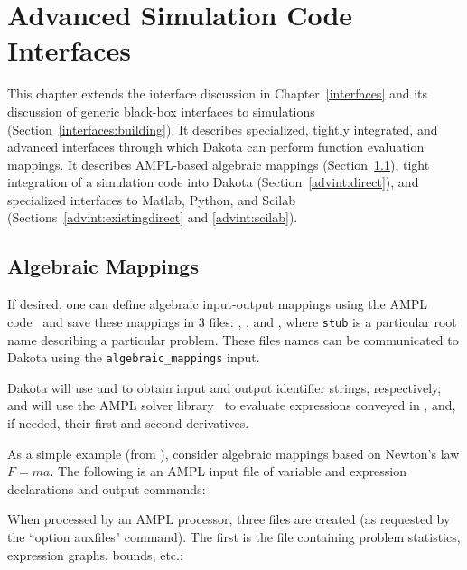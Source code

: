 \chapter{Advanced Simulation Code Interfaces}\label{advint}

This chapter extends the interface discussion in
Chapter~\ref{interfaces} and its discussion of generic black-box
interfaces to simulations (Section~\ref{interfaces:building}).  It
describes specialized, tightly integrated, and advanced interfaces
through which Dakota can perform function evaluation mappings.  It
describes AMPL-based algebraic mappings
(Section~\ref{advint:algebraic}), tight integration of a simulation
code into Dakota (Section~\ref{advint:direct}), and specialized
interfaces to Matlab, Python, and Scilab
(Sections~\ref{advint:existingdirect} and \ref{advint:scilab}).

\section{Algebraic Mappings}\label{advint:algebraic}

If desired, one can define algebraic input-output mappings using the
AMPL code~\cite{Fou03} and save these mappings in 3 files:
, , and , where
\texttt{stub} is a particular root name describing a particular
problem.  These files names can be communicated to Dakota using the
\texttt{algebraic\_mappings} input.

Dakota will use  and  to obtain
input and output identifier strings, respectively, and will use the
AMPL solver library~\cite{Gay97} to evaluate expressions conveyed
in , and, if needed, their first and second
derivatives.

As a simple example (from ), consider
algebraic mappings based on Newton's law $F = m a$.  The
following is an AMPL input file of variable and expression
declarations and output commands:
\begin{center}
\begin{bigbox}
\begin{small}
\end{small}
\end{bigbox}
\end{center}

When processed by an AMPL processor, three files are created (as
requested by the ``option auxfiles" command).  The first is the 
file containing problem statistics, expression graphs, bounds, etc.:
\begin{center}
\begin{bigbox}
\begin{small}
\end{small}
\end{bigbox}
\end{center}

